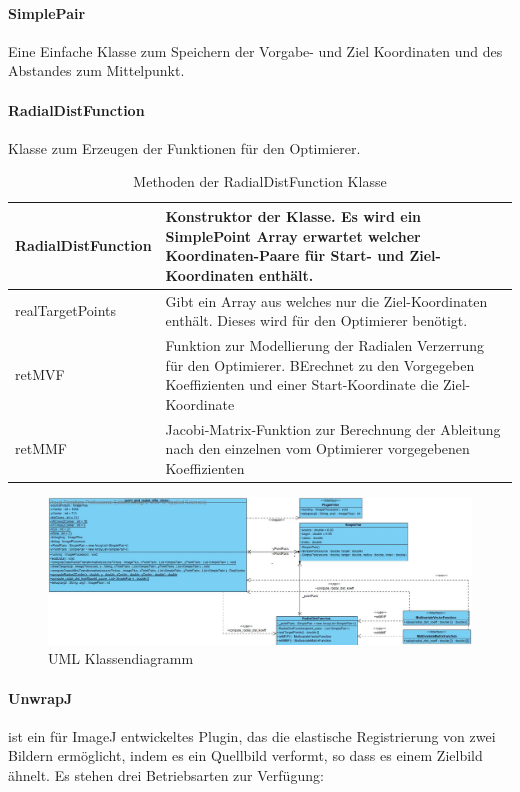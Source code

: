 \paragraph{SimplePair}
Eine Einfache Klasse zum Speichern der Vorgabe- und Ziel Koordinaten und des Abstandes zum Mittelpunkt.

\paragraph{RadialDistFunction}
Klasse zum Erzeugen der Funktionen für den Optimierer.

\begin{table}[H]
\begin{tabular}{p{} | p{}} 
RadialDistFunction & Konstruktor der Klasse. Es wird ein SimplePoint Array erwartet welcher Koordinaten-Paare für Start- und Ziel-Koordinaten enthält.\\ \hline
realTargetPoints & Gibt ein Array aus welches nur die Ziel-Koordinaten enthält. Dieses wird für den Optimierer benötigt.\\ \hline
retMVF & Funktion zur Modellierung der Radialen Verzerrung für den Optimierer. BErechnet zu den Vorgegeben Koeffizienten und einer Start-Koordinate die Ziel-Koordinate\\ \hline
retMMF & Jacobi-Matrix-Funktion zur Berechnung der Ableitung nach den einzelnen vom Optimierer vorgegebenen Koeffizienten \\ 
\end{tabular}
\caption{Methoden der RadialDistFunction Klasse}
\end{table}

\begin{figure}[H]
\center
\includegraphics[width=\textwidth]{Images/UML.JPG}
\caption{UML Klassendiagramm}
\label{img:UML}
\end{figure}


\paragraph{UnwrapJ}
 ist ein für ImageJ entwickeltes Plugin, das die elastische Registrierung von zwei Bildern ermöglicht, indem es ein Quellbild verformt, so dass es einem Zielbild ähnelt. 
Es stehen drei Betriebsarten zur Verfügung: 

